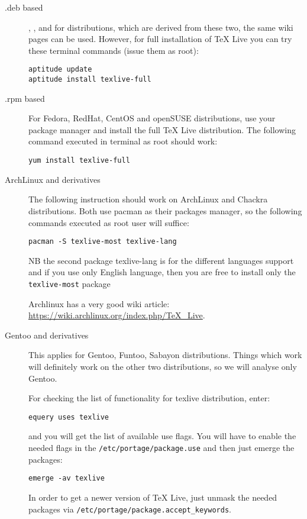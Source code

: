 \documentclass[
    draft
]{scrartcl}
\begin{document}
\begin{description}
    \item[.deb based] 
        ,
        ,
        and for distributions, which are derived from these two, the same wiki
        pages can be used. However, for full installation of \TeX{} Live you can try
        these terminal commands (issue them as root):
\begin{lstlisting}
aptitude update
aptitude install texlive-full
\end{lstlisting}

    \item[.rpm based]
        For Fedora, RedHat, CentOS and openSUSE distributions, use your package
        manager and install the full \TeX{} Live distribution. The following
        command executed in terminal as root should work:
\begin{lstlisting}
yum install texlive-full
\end{lstlisting}

    \item[ArchLinux and derivatives]
        The following instruction should work on ArchLinux and Chackra
        distributions. Both use pacman as their packages manager, so the
        following commands executed as root user will suffice:
\begin{lstlisting}
pacman -S texlive-most texlive-lang
\end{lstlisting}
        NB the second package texlive-lang is for the different languages
        support and if you use only English language, then you are free to
        install only the \verb|texlive-most| package

        Archlinux has a very good wiki article:
        \url{https://wiki.archlinux.org/index.php/TeX_Live}.
        
    \item[Gentoo and derivatives]
        This applies for Gentoo, Funtoo, Sabayon distributions. Things which
        work will definitely work on the other two distributions, so we will
        analyse only Gentoo.

        For checking the list of functionality for texlive distribution, enter:
\begin{lstlisting}
equery uses texlive
\end{lstlisting}
        and you will get the list of available use flags.
        You will have to enable the needed flags in the
        \verb|/etc/portage/package.use| and then just emerge the packages:
\begin{lstlisting}
emerge -av texlive
\end{lstlisting}
        In order to get a newer version of \TeX{} Live, just unmask the needed
        packages via \verb|/etc/portage/package.accept_keywords|.


\end{description}
\end{document}
